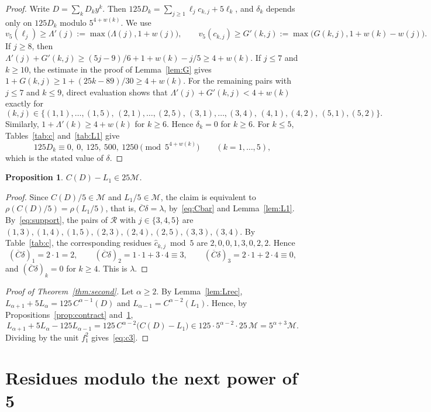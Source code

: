 \documentclass[11pt]{article}
\newtheorem{proposition}[theorem]{Proposition}
\theoremstyle{definition}
\theoremstyle{remark}
\numberwithin{equation}{section}
\newcommand{\Mod}{\mathscr{M}}
\newcommand{\Cb}{\overline{C}}
\begin{document}
\begin{proof}
Write $D=\sum_kD_ky^k$. Then $125D_k=\sum_{j\ge1}\ell_jc_{k,j}+5\ell_k$, and $\delta_k$ depends only on $125D_k$ modulo $5^{4+w(k)}$. We use
\[
v_5(\ell_j)\ge\Lambda'(j):=\max\bigl(\Lambda(j),1+w(j)\bigr),\qquad v_5(c_{k,j})\ge G'(k,j):=\max\bigl(G(k,j),1+w(k)-w(j)\bigr).
\]
If $j\ge8$, then $\Lambda'(j)+G'(k,j)\ge(5j-9)/6+1+w(k)-j/5\ge4+w(k)$. If $j\le7$ and $k\ge10$, the estimate in the proof of Lemma~\ref{lem:G} gives $1+G(k,j)\ge1+(25k-89)/30\ge4+w(k)$. For the remaining pairs with $j\le7$ and $k\le9$, direct evaluation shows that $\Lambda'(j)+G'(k,j)<4+w(k)$ exactly for
\[
(k,j)\in\{(1,1),\dots,(1,5),\,(2,1),\dots,(2,5),\,(3,1),\dots,(3,4),\,(4,1),(4,2),\,(5,1),(5,2)\}.
\]
Similarly, $1+\Lambda'(k)\ge4+w(k)$ for $k\ge6$. Hence $\delta_k=0$ for $k\ge6$. For $k\le5$, Tables~\ref{tab:c} and~\ref{tab:L1} give
\[
125D_k\equiv0,\ 0,\ 125,\ 500,\ 1250\pmod{5^{4+w(k)}}\qquad(k=1,\dots,5),
\]
which is the stated value of $\delta$.
\end{proof}

\begin{proposition}\label{prop:CD}
$C(D)-L_1\in25\Mod$.
\end{proposition}

\begin{proof}
Since $C(D)/5\in\Mod$ and $L_1/5\in\Mod$, the claim is equivalent to $\rho(C(D)/5)=\rho(L_1/5)$, that is, $\Cb\delta=\lambda$, by~\eqref{eq:Cbar} and Lemma~\ref{lem:L1}. By~\eqref{eq:support}, the pairs of $\mathcal{R}$ with $j\in\{3,4,5\}$ are $(1,3),(1,4),(1,5),(2,3),(2,4),(2,5),(3,3),(3,4)$. By Table~\ref{tab:c}, the corresponding residues $\hat c_{k,j}\bmod5$ are $2,0,0,1,3,0,2,2$. Hence
\[
(\Cb\delta)_1=2\cdot1=2,\qquad(\Cb\delta)_2=1\cdot1+3\cdot4\equiv3,\qquad(\Cb\delta)_3=2\cdot1+2\cdot4\equiv0,
\]
and $(\Cb\delta)_k=0$ for $k\ge4$. This is $\lambda$.
\end{proof}

\begin{proof}[Proof of Theorem~\ref{thm:second}]
Let $\alpha\ge2$. By Lemma~\ref{lem:Lrec}, $L_{\alpha+1}+5L_\alpha=125\,C^{\alpha-1}(D)$ and $L_{\alpha-1}=C^{\alpha-2}(L_1)$. Hence, by Propositions~\ref{prop:contract} and~\ref{prop:CD},
\[
L_{\alpha+1}+5L_\alpha-125L_{\alpha-1}=125\,C^{\alpha-2}\bigl(C(D)-L_1\bigr)\in125\cdot5^{\alpha-2}\cdot25\,\Mod=5^{\alpha+3}\Mod.
\]
Dividing by the unit $f_1^2$ gives~\eqref{eq:c3}.
\end{proof}

\section{Residues modulo the next power of 5}\label{sec:next}
\end{document}
